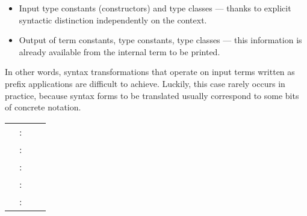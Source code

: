 \begin{isabellebody}
\begin{isamarkuptext}
\begin{itemize}
  \item Input type constants (constructors) and type classes ---
  thanks to explicit syntactic distinction independently on the
  context.

  \item Output of term constants, type constants, type classes ---
  this information is already available from the internal term to be
  printed.

  \end{itemize}

  In other words, syntax transformations that operate on input terms
  written as prefix applications are difficult to achieve.  Luckily,
  this case rarely occurs in practice, because syntax forms to be
  translated usually correspond to some bits of concrete notation.%
\end{isamarkuptext}%
\isamarkuptrue%
%
\isamarkuptrue%
%
\begin{isamarkuptext}%
\begin{tabular}{rcll}
    \indexdef{}{command}{nonterminal}\hypertarget{command.nonterminal}{\hyperlink{command.nonterminal}{\mbox{\isa{\isacommand{nonterminal}}}}} & : & \isa{{\isaliteral{22}{\isachardoublequote}}theory\ {\isaliteral{5C3C72696768746172726F773E}{\isasymrightarrow}}\ theory{\isaliteral{22}{\isachardoublequote}}} \\
    \indexdef{}{command}{syntax}\hypertarget{command.syntax}{\hyperlink{command.syntax}{\mbox{\isa{\isacommand{syntax}}}}} & : & \isa{{\isaliteral{22}{\isachardoublequote}}theory\ {\isaliteral{5C3C72696768746172726F773E}{\isasymrightarrow}}\ theory{\isaliteral{22}{\isachardoublequote}}} \\
    \indexdef{}{command}{no\_syntax}\hypertarget{command.no-syntax}{\hyperlink{command.no-syntax}{\mbox{\isa{\isacommand{no{\isaliteral{5F}{\isacharunderscore}}syntax}}}}} & : & \isa{{\isaliteral{22}{\isachardoublequote}}theory\ {\isaliteral{5C3C72696768746172726F773E}{\isasymrightarrow}}\ theory{\isaliteral{22}{\isachardoublequote}}} \\
    \indexdef{}{command}{translations}\hypertarget{command.translations}{\hyperlink{command.translations}{\mbox{\isa{\isacommand{translations}}}}} & : & \isa{{\isaliteral{22}{\isachardoublequote}}theory\ {\isaliteral{5C3C72696768746172726F773E}{\isasymrightarrow}}\ theory{\isaliteral{22}{\isachardoublequote}}} \\
    \indexdef{}{command}{no\_translations}\hypertarget{command.no-translations}{\hyperlink{command.no-translations}{\mbox{\isa{\isacommand{no{\isaliteral{5F}{\isacharunderscore}}translations}}}}} & : & \isa{{\isaliteral{22}{\isachardoublequote}}theory\ {\isaliteral{5C3C72696768746172726F773E}{\isasymrightarrow}}\ theory{\isaliteral{22}{\isachardoublequote}}} \\

\end{tabular}
\end{isamarkuptext}
\end{isabellebody}

